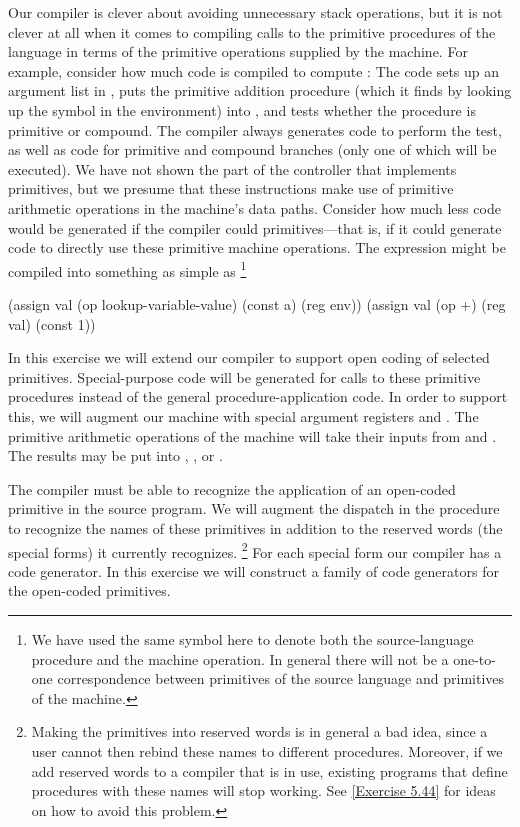 \begin{exercise}
	\label{Exercise 5.38}
	Our compiler is clever about avoiding unnecessary stack operations, but it is not clever at all when it comes to compiling calls to the primitive procedures of the language in terms of the primitive operations supplied by the machine.
	For example, consider how much code is compiled to compute :
	The code sets up an argument list in , puts the primitive addition procedure (which it finds by looking up the symbol \code{+} in the environment) into , and tests whether the procedure is primitive or compound.
	The compiler always generates code to perform the test, as well as code for primitive and compound branches (only one of which will be executed).
	We have not shown the part of the controller that implements primitives, but we presume that these instructions make use of primitive arithmetic operations in the machine’s data paths.
	Consider how much less code would be generated if the compiler could  primitives---that is, if it could generate code to directly use these primitive machine operations.
	The expression  might be compiled into something as simple as%
	\footnote{
		We have used the same symbol \code{+} here to denote both the source-language procedure and the machine operation.
		In general there will not be a one-to-one correspondence between primitives of the source language and primitives of the machine.
	}
	\begin{scheme}
	  (assign
	   val (op lookup-variable-value) (const a) (reg env))
	  (assign val (op +) (reg val) (const 1))
	\end{scheme}
	In this exercise we will extend our compiler to support open coding of selected primitives.
	Special-purpose code will be generated for calls to these primitive procedures instead of the general procedure-application code.
	In order to support this, we will augment our machine with special argument registers  and .
	The primitive arithmetic operations of the machine will take their inputs from  and .
	The results may be put into , , or .

	The compiler must be able to recognize the application of an open-coded primitive in the source program.
	We will augment the dispatch in the  procedure to recognize the names of these primitives in addition to the reserved words (the special forms) it currently recognizes.%
	\footnote{
		Making the primitives into reserved words is in general a bad idea, since a user cannot then rebind these names to different procedures.
		Moreover, if we add reserved words to a compiler that is in use, existing programs that define procedures with these names will stop working.
		See \cref{Exercise 5.44} for ideas on how to avoid this problem.
	}
	For each special form our compiler has a code generator.
	In this exercise we will construct a family of code generators for the open-coded primitives.
	\begin{enumerate}[label = \alph*., leftmargin = *]


\end{enumerate}
\end{exercise}
